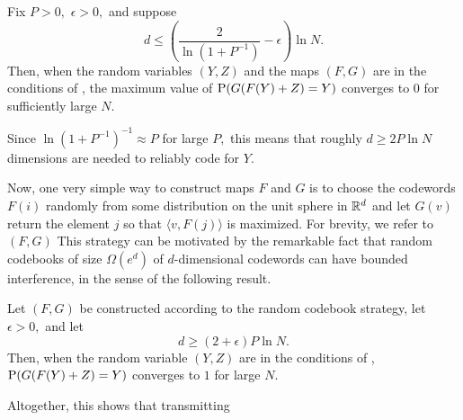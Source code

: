 \begin{corollary} \label{prop:information-simple}
    Fix $P > 0,$ $\epsilon > 0,$ and suppose
    $$
    d \le \left(\frac 2 {\ln(1 + P^{-1})} - \epsilon\right) \ln N.
    $$
    Then, when the random variables $(Y, Z)$ and the maps $(F, G)$ are in the conditions of , the maximum value of $\operatorname{P}(G(F(Y) + Z) = Y)$ converges to $0$ for sufficiently large $N.$
\end{corollary}

Since $\ln(1 + P^{-1})^{-1} \approx P$ for large $P,$ this means that roughly $d \ge 2 P \ln N$ dimensions are needed to reliably code for $Y.$

Now, one very simple way to construct maps $F$ and $G$ is to choose the codewords $F(i)$ randomly from some distribution on the unit sphere in $\mathbb{R}^d$ and let $G(v)$ return the element $j$ so that $\langle v, F(j) \rangle$ is maximized. For brevity, we refer to $(F, G)$ This strategy can be motivated by the remarkable fact that random codebooks of size $\Omega(e^d)$ of $d$-dimensional codewords can have bounded interference, in the sense of the following result.

\begin{proposition} \label{prop:random-information}
    Let $(F, G)$ be constructed according to the random codebook strategy, let $\epsilon > 0,$ and let
    $$
    d \ge (2 + \epsilon) P \ln N.
    $$
    Then, when the random variable $(Y, Z)$ are in the conditions of , $\operatorname{P}(G(F(Y) + Z) = Y)$ converges to $1$ for large $N.$
\end{proposition}

Altogether, this shows that transmitting

